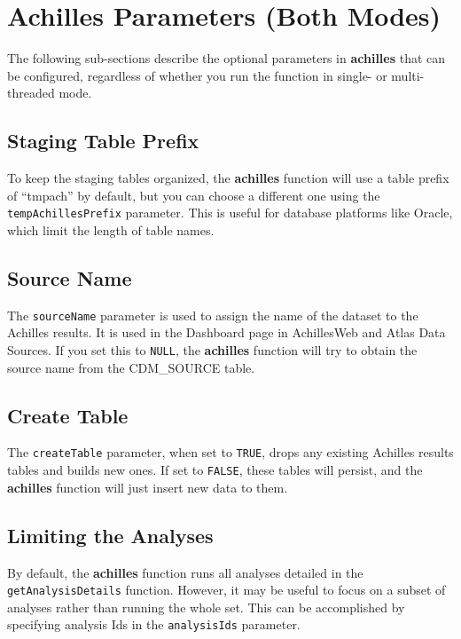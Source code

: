 \documentclass[]{article}
\begin{document}
\section{Achilles Parameters (Both
Modes)}\label{achilles-parameters-both-modes}

The following sub-sections describe the optional parameters in
\textbf{achilles} that can be configured, regardless of whether you run
the function in single- or multi-threaded mode.

\subsection{Staging Table Prefix}\label{staging-table-prefix}

To keep the staging tables organized, the \textbf{achilles} function
will use a table prefix of ``tmpach'' by default, but you can choose a
different one using the \texttt{tempAchillesPrefix} parameter. This is
useful for database platforms like Oracle, which limit the length of
table names.

\subsection{Source Name}\label{source-name}

The \texttt{sourceName} parameter is used to assign the name of the
dataset to the Achilles results. It is used in the Dashboard page in
AchillesWeb and Atlas Data Sources. If you set this to \texttt{NULL},
the \textbf{achilles} function will try to obtain the source name from
the CDM\_SOURCE table.

\subsection{Create Table}\label{create-table}

The \texttt{createTable} parameter, when set to \texttt{TRUE}, drops any
existing Achilles results tables and builds new ones. If set to
\texttt{FALSE}, these tables will persist, and the \textbf{achilles}
function will just insert new data to them.

\subsection{Limiting the Analyses}\label{limiting-the-analyses}

By default, the \textbf{achilles} function runs all analyses detailed in
the \texttt{getAnalysisDetails} function. However, it may be useful to
focus on a subset of analyses rather than running the whole set. This
can be accomplished by specifying analysis Ids in the
\texttt{analysisIds} parameter.
\end{document}
